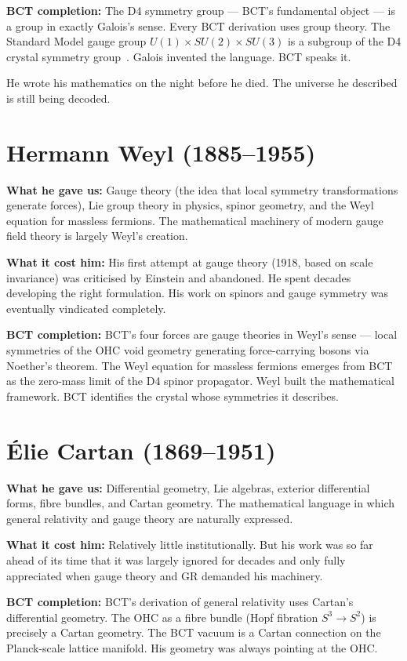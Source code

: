 \documentclass[twocolumn,10pt]{article}
\begin{document}
\textbf{BCT completion:} The D4 symmetry group --- BCT's
fundamental object --- is a group in exactly Galois's sense.
Every BCT derivation uses group theory. The Standard Model
gauge group $U(1) \times SU(2) \times SU(3)$ is a subgroup
of the D4 crystal symmetry group~\cite{bct_l57}.
Galois invented the language. BCT speaks it.

He wrote his mathematics on the night before he died.
The universe he described is still being decoded.

\section{Hermann Weyl (1885--1955)}

\textbf{What he gave us:} Gauge theory (the idea that local
symmetry transformations generate forces), Lie group theory
in physics, spinor geometry, and the Weyl equation for
massless fermions. The mathematical machinery of modern
gauge field theory is largely Weyl's creation.

\textbf{What it cost him:} His first attempt at gauge theory
(1918, based on scale invariance) was criticised by Einstein
and abandoned. He spent decades developing the right
formulation. His work on spinors and gauge symmetry was
eventually vindicated completely.

\textbf{BCT completion:} BCT's four forces are gauge theories
in Weyl's sense --- local symmetries of the OHC void geometry
generating force-carrying bosons via Noether's theorem. The Weyl
equation for massless fermions emerges from BCT as the
zero-mass limit of the D4 spinor propagator. Weyl built
the mathematical framework. BCT identifies the crystal
whose symmetries it describes.

\section{\'Elie Cartan (1869--1951)}

\textbf{What he gave us:} Differential geometry, Lie algebras,
exterior differential forms, fibre bundles, and Cartan geometry.
The mathematical language in which general relativity and
gauge theory are naturally expressed.

\textbf{What it cost him:} Relatively little institutionally.
But his work was so far ahead of its time that it was largely
ignored for decades and only fully appreciated when gauge theory
and GR demanded his machinery.

\textbf{BCT completion:} BCT's derivation of general relativity
uses Cartan's differential geometry. The OHC as a fibre bundle
(Hopf fibration $S^3 \to S^2$) is precisely a Cartan geometry.
The BCT vacuum is a Cartan connection on the Planck-scale
lattice manifold. His geometry was always pointing at the OHC.
\end{document}
